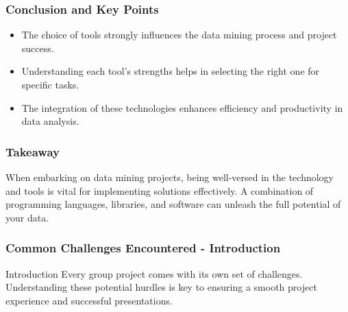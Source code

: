 \documentclass[aspectratio=169]{beamer}
\begin{document}
\begin{frame}
    \frametitle{Conclusion and Key Points}
    \begin{itemize}
        \item The choice of tools strongly influences the data mining process and project success.
        \item Understanding each tool's strengths helps in selecting the right one for specific tasks.
        \item The integration of these technologies enhances efficiency and productivity in data analysis.
    \end{itemize}
\end{frame}

\begin{frame}
    \frametitle{Takeaway}
    When embarking on data mining projects, being well-versed in the technology and tools is vital for implementing solutions effectively. A combination of programming languages, libraries, and software can unleash the full potential of your data.
\end{frame}

\begin{frame}[fragile]
    \frametitle{Common Challenges Encountered - Introduction}
    \begin{block}{Introduction}
        Every group project comes with its own set of challenges. Understanding these potential hurdles is key to ensuring a smooth project experience and successful presentations.
    \end{block}
\end{frame}
\end{document}
